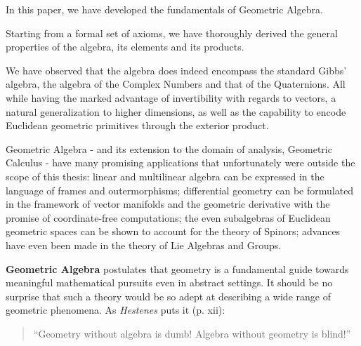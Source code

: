 In this paper, we have developed the fundamentals of Geometric Algebra.

Starting from a formal set of axioms, we have thoroughly derived the general properties of the algebra, its elements and its products.

We have observed that the algebra does indeed encompass the standard Gibbs' algebra, the algebra of the Complex Numbers and that of the Quaternions. All while having the marked advantage of invertibility with regards to vectors, a natural generalization to higher dimensions, as well as the capability to encode Euclidean geometric primitives through the exterior product.

Geometric Algebra - and its extension to the domain of analysis, Geometric Calculus - have many promising applications that unfortunately were outside the scope of this thesis: linear and multilinear algebra can be expressed in the language of frames and outermorphisms; differential geometry can be formulated in the framework of vector manifolds and the geometric derivative with the promise of coordinate-free computations; the even subalgebras of Euclidean geometric spaces can be shown to account for the theory of Spinors; advances have even been made in the theory of Lie Algebras and Groups.

\textbf{Geometric Algebra} postulates that geometry is a fundamental guide towards meaningful mathematical pursuits even in abstract settings. It should be no surprise that such a theory would be so adept at describing a wide range of geometric phenomena. As \textit{Hestenes} puts it (p. xii)\cite{ga-origin}:
\begin{quote}
	``Geometry without algebra is dumb! Algebra without geometry is blind!''
\end{quote}


